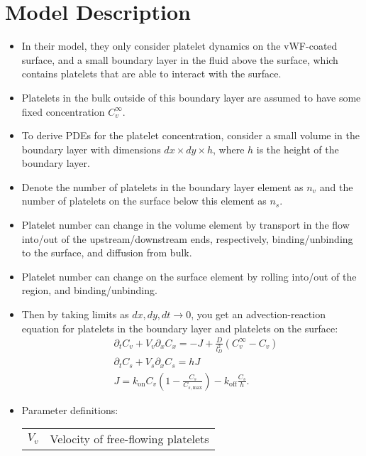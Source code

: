 \documentclass[
10pt, %
letterpaper, %
twocolumn, %
landscape %
]{article}
\begin{document}

\section{Model Description}

\begin{itemize}
\item In their model, they only consider platelet dynamics on the
  vWF-coated surface, and a small boundary layer in the fluid above
  the surface, which contains platelets that are able to interact with
  the surface.
\item Platelets in the bulk outside of this boundary layer are assumed
  to have some fixed concentration $C_v^\infty$.
\item To derive PDEs for the platelet concentration, consider a small
  volume in the boundary layer with dimensions $dx \times dy \times
  h$, where $h$ is the height of the boundary layer.
\item Denote the number of platelets in the boundary layer element as
  $n_v$ and the number of platelets on the surface below this element
  as $n_s$. 
\item Platelet number can change in the volume element by
  transport in the flow into/out of the upstream/downstream ends,
  respectively, binding/unbinding to the surface, and diffusion from
  bulk. 
\item Platelet number can change on the surface element by rolling
  into/out of the region, and binding/unbinding. 
\item Then by taking limits as $dx, dy, dt \rightarrow 0$, you get an
  advection-reaction equation for platelets in the boundary layer and
  platelets on the surface:  
  \begin{align}
    \label{eq:dimensional_pde1}
    &\partial_t C_v + V_v \partial_x C_x = -J +
    \frac{D}{l_D^2}(C_v^\infty - C_v) \\
    \label{eq:dimensional_pde2}
    &\partial_t C_s + V_s \partial_x C_s = h J \\
    \label{eq:dimensional_reaction} 
    &J = k_\text{on} C_v \left(1 - \frac{C_s}{C_{s,
      \text{max}}}\right) - k_\text{off} \frac{C_s}{h}.
  \end{align}
\item Parameter definitions:\\
  \begin{tabular}{|c|c|}
    \hline
    $V_v$ & Velocity of free-flowing platelets \\

\end{tabular}
\end{itemize}
\end{document}
